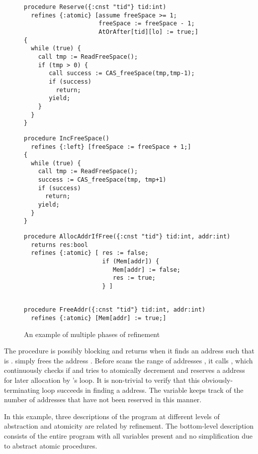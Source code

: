 \begin{figure}
\begin{small}
\begin{verbatim}
procedure Reserve({:cnst "tid"} tid:int) 
  refines {:atomic} [assume freeSpace >= 1; 
                     freeSpace := freeSpace - 1;
                     AtOrAfter[tid][lo] := true;]
{
  while (true) {
    call tmp := ReadFreeSpace();
    if (tmp > 0) {
       call success := CAS_freeSpace(tmp,tmp-1);
       if (success)
         return; 
       yield;
    }
  }
}
\end{verbatim}
\begin{verbatim}
procedure IncFreeSpace() 
  refines {:left} [freeSpace := freeSpace + 1;]
{
  while (true) {
    call tmp := ReadFreeSpace();
    success := CAS_freeSpace(tmp, tmp+1)
    if (success)  
      return;
    yield;
  }
}
\end{verbatim}
\begin{verbatim}
procedure AllocAddrIfFree({:cnst "tid"} tid:int, addr:int) 
  returns res:bool
  refines {:atomic} [ res := false;
                      if (Mem[addr]) {
                         Mem[addr] := false; 
                         res := true;
                      } ]
                    
\end{verbatim}
\begin{verbatim}
procedure FreeAddr({:cnst "tid"} tid:int, addr:int)
  refines {:atomic} [Mem[addr] := true;]
\end{verbatim}
\end{small}
\caption{An example of multiple phases of refinement}
\label{fig:refinementBot}
\end{figure}

The  procedure is possibly blocking and returns when it
finds an address  such that  is
.  simply frees the address
. 
Before  scans the range of addresses
\exC{[lo,hi]}, it calls , which continuously checks if
 and tries to atomically decrement 
and reserves a  address for later allocation by
's  loop. It is non-trivial to verify that this
obviously-terminating  loop succeeds in finding a
 address. The variable  keeps track of the
number of  addresses that have not been reserved in this
manner. 

In this example, three descriptions of the program at different levels
of abstraction and atomicity are related by refinement. 
The bottom-level description consists of the entire program with all
variables present and no simplification due to abstract atomic
procedures. 

